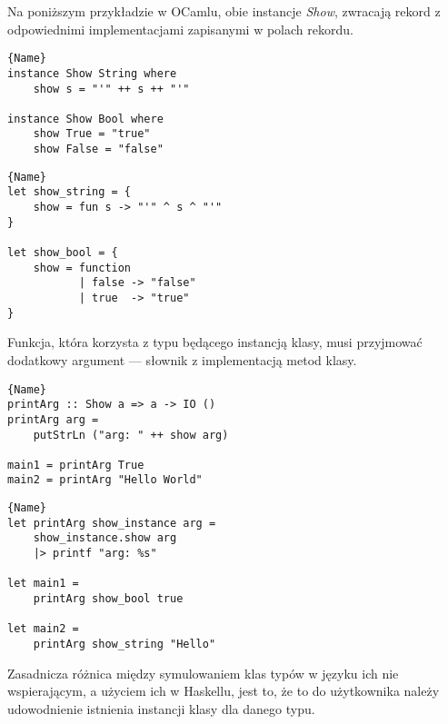 \documentclass[declaration,shortabstract]{iithesis}
\begin{document}
Na poniższym przykładzie w OCamlu, obie instancje \textit{Show}, zwracają 
rekord z odpowiednimi implementacjami zapisanymi w polach rekordu. 

\noindent\begin{minipage}{.45\textwidth}
\begin{lstlisting}[caption=Instancja klasy w Haskellu, frame=tlrb]{Name}
instance Show String where
    show s = "'" ++ s ++ "'"

instance Show Bool where
    show True = "true"
    show False = "false" 

\end{lstlisting}
\end{minipage}\hfill
\begin{minipage}{.45\textwidth}
\begin{lstlisting}[caption=Instancja klasy w OCamlu, frame=tlrb]{Name}
let show_string = {
    show = fun s -> "'" ^ s ^ "'"
}

let show_bool = {
    show = function 
           | false -> "false"
           | true  -> "true"
}

\end{lstlisting}
\end{minipage}

Funkcja, która korzysta z typu będącego instancją klasy, musi przyjmować 
dodatkowy argument --- słownik z implementacją metod klasy. 

\noindent\begin{minipage}{.45\textwidth}
\begin{lstlisting}[caption=Instancja klasy w Haskellu, frame=tlrb]{Name}
printArg :: Show a => a -> IO ()
printArg arg = 
    putStrLn ("arg: " ++ show arg)

main1 = printArg True
main2 = printArg "Hello World"
\end{lstlisting}
\end{minipage}\hfill
\begin{minipage}{.45\textwidth}
\begin{lstlisting}[caption=Instancja klasy w OCamlu, frame=tlrb]{Name}
let printArg show_instance arg = 
    show_instance.show arg
    |> printf "arg: %s" 

let main1 = 
    printArg show_bool true 

let main2 = 
    printArg show_string "Hello"
\end{lstlisting}
\end{minipage}

Zasadnicza różnica między symulowaniem klas typów w języku ich nie 
wspierającym, a użyciem ich w Haskellu, jest to, że to do użytkownika należy 
udowodnienie istnienia instancji klasy dla danego typu.
\end{document}
